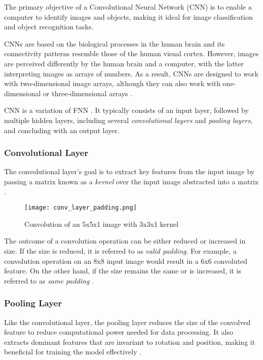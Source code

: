 The primary objective of a Convolutional Neural Network (CNN) is to enable a computer to identify images and objects, making it ideal for image classification and object recognition tasks. 

CNNs are based on the biological processes in the human brain and its connectivity patterns resemble those of the human visual cortex. However, images are perceived differently by the human brain and a computer, with the latter interpreting images as arrays of numbers. As a result, CNNs are designed to work with two-dimensional image arrays, although they can also work with one-dimensional or three-dimensional arrays \cite{mlmastery}.

CNN is a variation of FNN \cite{Goodfellow-et-al-2016}.  It typically consists of an input layer, followed by multiple hidden layers, including several \textit{convolutional layers} and \textit{pooling layers}, and concluding with an output layer.

\subsubsection{Convolutional Layer}

The convolutional layer's goal is to extract key features from the input image by passing a matrix known as a \textit{kernel} over the input image abstracted into a matrix \cite{mathworkscnn}.

\begin{figure}[h]
	\centering
    \texttt{[image: conv\_layer\_padding.png]}
	\caption{Convolution of an 5x5x1 image with 3x3x1 kernel \cite{compguideCnn}}
	\label{fig:cnn_conv}
\end{figure}


The outcome of a convolution operation can be either reduced or increased in size. If the size is reduced, it is referred to as \textit{valid padding}. For example, a convolution operation on an 8x8 input image would result in a 6x6 convoluted feature. On the other hand, if the size remains the same or is increased, it is referred to as \textit{same padding} \cite{compguideCnn}.

\subsubsection{Pooling Layer}


Like the convolutional layer, the pooling layer reduces the size of the convolved feature to reduce computational power needed for data processing. It also extracts dominant features that are invariant to rotation and position, making it beneficial for training the model effectively \cite{compguideCnn}.

